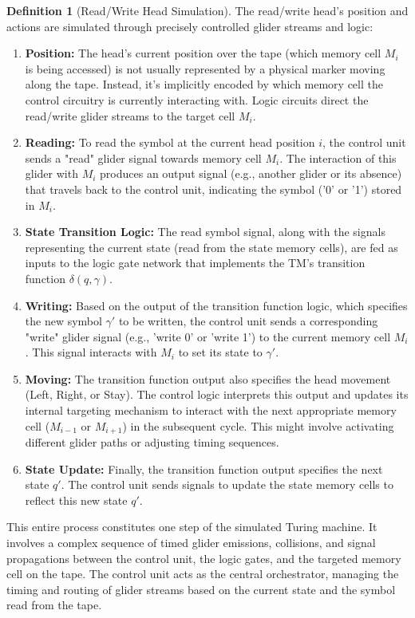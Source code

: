 \documentclass{article}
\theoremstyle{definition}
\newtheorem{definition}{Definition}[section]
\theoremstyle{plain}
\theoremstyle{plain}
\begin{document}
\begin{definition}[Read/Write Head Simulation]
The read/write head's position and actions are simulated through precisely controlled glider streams and logic:
\begin{enumerate}
  \item \textbf{Position:} The head's current position over the tape (which memory cell $M_i$ is being accessed) is not usually represented by a physical marker moving along the tape. Instead, it's implicitly encoded by which memory cell the control circuitry is currently interacting with. Logic circuits direct the read/write glider streams to the target cell $M_i$.
  \item \textbf{Reading:} To read the symbol at the current head position $i$, the control unit sends a "read" glider signal towards memory cell $M_i$. The interaction of this glider with $M_i$ produces an output signal (e.g., another glider or its absence) that travels back to the control unit, indicating the symbol ('0' or '1') stored in $M_i$.
  \item \textbf{State Transition Logic:} The read symbol signal, along with the signals representing the current state (read from the state memory cells), are fed as inputs to the logic gate network that implements the TM's transition function $\delta(q, \gamma)$.
  \item \textbf{Writing:} Based on the output of the transition function logic, which specifies the new symbol $\gamma'$ to be written, the control unit sends a corresponding "write" glider signal (e.g., 'write 0' or 'write 1') to the current memory cell $M_i$. This signal interacts with $M_i$ to set its state to $\gamma'$.
  \item \textbf{Moving:} The transition function output also specifies the head movement (Left, Right, or Stay). The control logic interprets this output and updates its internal targeting mechanism to interact with the next appropriate memory cell ($M_{i-1}$ or $M_{i+1}$) in the subsequent cycle. This might involve activating different glider paths or adjusting timing sequences.
  \item \textbf{State Update:} Finally, the transition function output specifies the next state $q'$. The control unit sends signals to update the state memory cells to reflect this new state $q'$.
\end{enumerate}
\end{definition}

This entire process constitutes one step of the simulated Turing machine. It involves a complex sequence of timed glider emissions, collisions, and signal propagations between the control unit, the logic gates, and the targeted memory cell on the tape. The control unit acts as the central orchestrator, managing the timing and routing of glider streams based on the current state and the symbol read from the tape.
\end{document}

